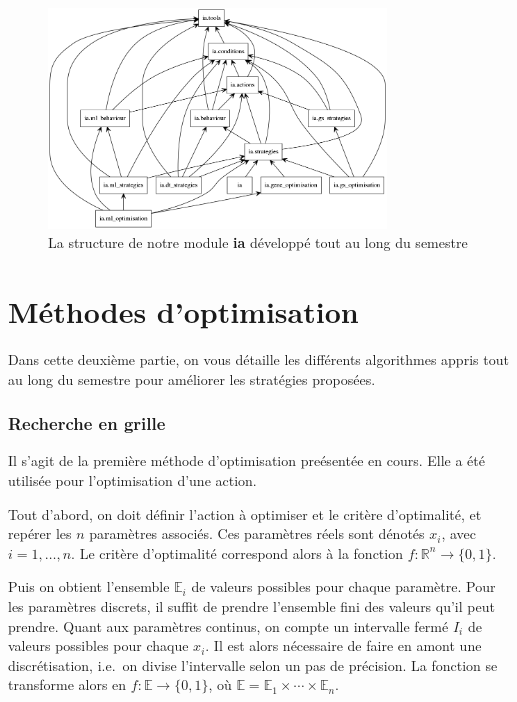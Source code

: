 \documentclass[12pt,a4paper]{article}
\begin{document}
\begin{figure}[!h]
  \centering
  \captionsetup{justification=centering}
  \includegraphics[width=0.8\textwidth]{packages_IA}
  \caption[La structure du module]{La structure de notre module {\bfseries ia} 
d\'evelopp\'e tout au long du semestre}
  \label{fig:diag_classes}
\end{figure}

\newpage

\part{M\'ethodes d'optimisation}
Dans cette deuxi\`eme partie, on vous d\'etaille les diff\'erents 
algorithmes appris tout au long du semestre pour am\'eliorer 
les strat\'egies propos\'ees.

\section{Recherche en grille}
Il s'agit de la premi\`ere m\'ethode d'optimisation pre\'esent\'ee en cours. 
Elle a \'et\'e utilis\'ee pour l'optimisation d'une action.

Tout d'abord, on doit d\'efinir l'action \`a optimiser et le crit\`ere 
d'optimalit\'e, et rep\'erer les $n$ param\`etres associ\'es. Ces param\`etres 
r\'eels sont d\'enot\'es $x_i$, avec $i=1,\dotsc,n$. Le crit\`ere 
d'optimalit\'e correspond alors \`a la fonction $f: \mathbb{R}^n \to \{0,1\}$.

Puis on obtient l'ensemble $\mathbb{E}_i$ de valeurs possibles pour chaque 
param\`etre. 
Pour les param\`etres discrets, il suffit de prendre l'ensemble 
fini des valeurs qu'il peut prendre. 
Quant aux param\`etres continus, on compte un intervalle ferm\'e $I_i$ de 
valeurs possibles pour chaque $x_i$. Il est alors n\'ecessaire de faire en 
amont une discr\'etisation, i.e.\ on divise l'intervalle selon un pas de 
pr\'ecision. La fonction se transforme alors en $f: \mathbb{E} \to \{0,1\}$, 
o\`u $\mathbb{E} =  \mathbb{E}_1 \times \cdots \times \mathbb{E}_n$.
\end{document}
